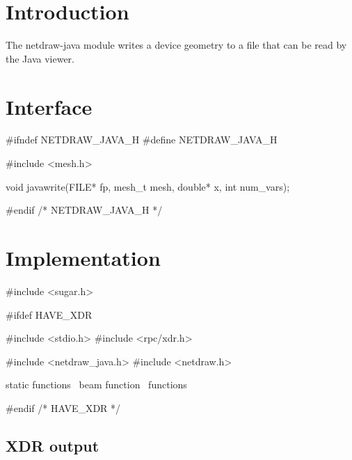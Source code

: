 \section{Introduction}%

The {\Tt{}netdraw-java\nwendquote} module writes a device geometry to a file
that can be read by the Java viewer.


\section{Interface}

\endmoddef\nwstartdeflinemarkup\nwenddeflinemarkup
#ifndef NETDRAW_JAVA_H
#define NETDRAW_JAVA_H

#include <mesh.h>

void javawrite(FILE* fp, mesh_t mesh, double* x, int num_vars);

#endif /* NETDRAW_JAVA_H */
\nwendcode{}\nwdocspar


\section{Implementation}

\nwenddocs{}\endmoddef\nwstartdeflinemarkup\nwenddeflinemarkup
#include <sugar.h>

#ifdef HAVE_XDR

#include <stdio.h>
#include <rpc/xdr.h>

#include <netdraw_java.h>
#include <netdraw.h>

\LA{}static functions~{\nwtagstyle{}}\RA{}
\LA{}beam function~{\nwtagstyle{}}\RA{}
\LA{}functions~{\nwtagstyle{}}\RA{}

#endif /* HAVE_XDR */
\nwendcode{}\nwdocspar

\subsection{XDR output}

